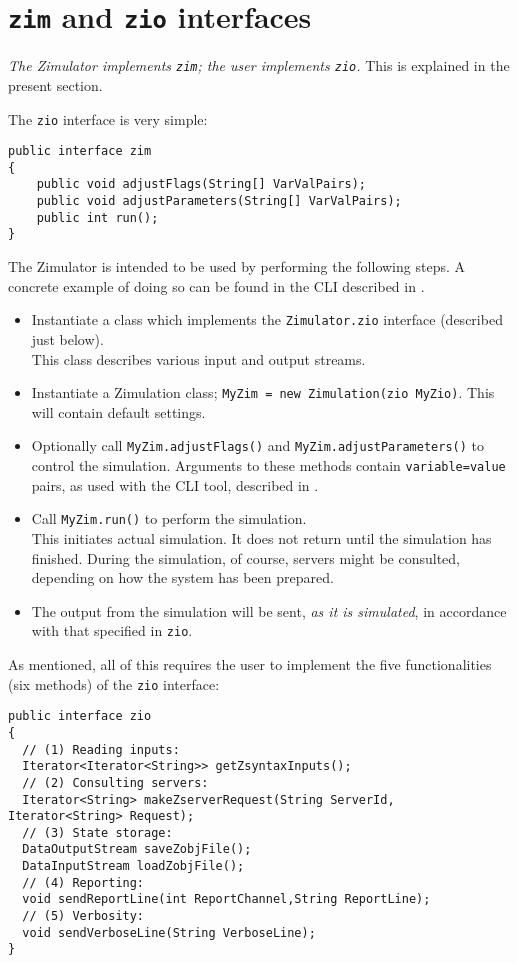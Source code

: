 \section{{\tt zim} and {\tt zio} interfaces}
\label{Sec:zimzio}

\emph{The Zimulator implements {\tt zim}; the user implements {\tt zio}.}
This is explained in the present section.

The {\tt zio} interface is very simple:
\begin{lstlisting}[mathescape]
public interface zim
{
    public void adjustFlags(String[] VarValPairs);   
    public void adjustParameters(String[] VarValPairs);
    public int run();
}
\end{lstlisting}
The Zimulator is intended to be used by performing the following
steps. A concrete example of doing so can be found in the CLI
described in .
\begin{itemize}
\item  Instantiate a class which implements the {\tt Zimulator.zio} interface (described just below). \\
  This class describes various input and output streams.
\item  Instantiate a Zimulation class; {\tt MyZim = new Zimulation(zio MyZio)}. This will contain default settings.
\item  Optionally call {\tt MyZim.adjustFlags()} and {\tt MyZim.adjustParameters()} to control the simulation.
  Arguments to these methods contain {\tt variable=value} pairs, as used with the CLI tool, described in .
\item Call {\tt MyZim.run()} to perform the simulation. \\
  This initiates actual simulation. It does not return until the simulation has finished.
  During the simulation, of course, servers might be consulted, depending on how the system has been prepared.
\item The output from the simulation will be sent, \emph{as it is simulated}, in accordance with that specified in {\tt zio}.
\end{itemize}

As mentioned, all of this requires the user to implement the five functionalities (six methods) of the {\tt zio} interface:
\begin{lstlisting}[mathescape]
public interface zio
{
  // (1) Reading inputs:
  Iterator<Iterator<String>> getZsyntaxInputs();
  // (2) Consulting servers:
  Iterator<String> makeZserverRequest(String ServerId, Iterator<String> Request);
  // (3) State storage:
  DataOutputStream saveZobjFile();
  DataInputStream loadZobjFile();
  // (4) Reporting:
  void sendReportLine(int ReportChannel,String ReportLine);
  // (5) Verbosity:
  void sendVerboseLine(String VerboseLine);
}
\end{lstlisting}


